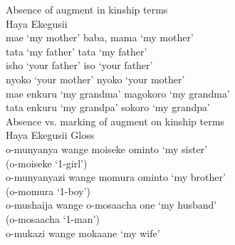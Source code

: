 \documentclass[output=paper]{langscibook}
\begin{document}
  \ex\label{hayagusii9b} Absence of augment in kinship terms \\
  \glllllll Haya {}  Ekegusii {} \\
  mae  {`my mother'} 		{baba, mama}  {`my mother'} \\
  tata 	 {`my father'} 		tata  {`my father'} \\
	isho  {`your father'} 	iso   {`your father'}\\
  nyoko    {`your mother'}   	nyoko  {`your mother'} \\
  {mae enkuru}	 {`my grandma'} 	magokoro  {`my grandma'} \\
  {tata enkuru}	 {`my grandpa'} 	sokoro  {`my grandpa'}\\

  \ex\label{hayagusii9c} Absence vs. marking of augment on kinship terms \\
   \gllllllll Haya   Ekegusii  Gloss \\
   {o-munyanya wange}		{moiseke ominto}    {`my sister'} \\
   {} {(o-moiseke ‘1-girl’)} {}\\
   {o-munyanyazi wange}		{momura ominto}         {`my brother'}\\
   {} {(o-momura ‘1-boy’)} {}\\
   {o-mushaija wange}	 	{o-mosaacha one}     {`my husband'}\\
   {} {(o-mosaacha ‘1-man’)} {}\\
   {o-mukazi wange}		mokaane   {`my wife'}\\
   \z
\z
\end{document}
